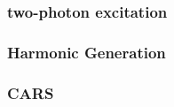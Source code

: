 \cite{book_confocal}

\cite{confocal_microscope}


\subsubsection{two-photon excitation}
\label{sec:twoPhotonExcitation}

\cite{TPFM_gated_wavefront}
\cite{TPFM_image_based}
\cite{TPFM_pratical}

\subsubsection{Harmonic Generation}
\label{sec:HarmonicGeneration}

\cite{HG_embryos}
\cite{HG_dynamic}


\subsubsection{CARS}
\label{sec:CARS}

\cite{CARS}



